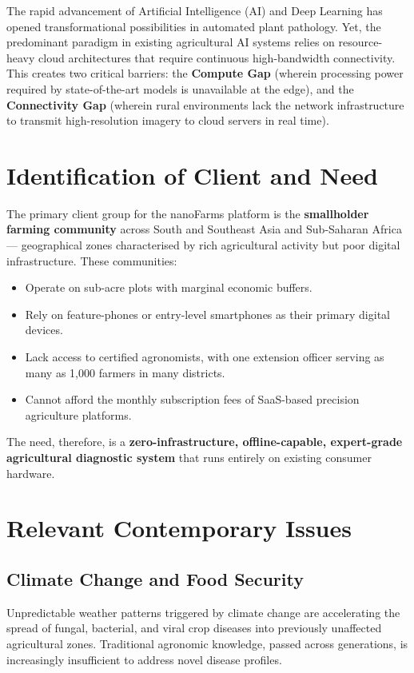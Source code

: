 \documentclass[12pt,oneside]{report}
\begin{document}
The rapid advancement of Artificial Intelligence (AI) and Deep Learning has opened transformational possibilities in automated plant pathology. Yet, the predominant paradigm in existing agricultural AI systems relies on resource-heavy cloud architectures that require continuous high-bandwidth connectivity. This creates two critical barriers: the \textbf{Compute Gap} (wherein processing power required by state-of-the-art models is unavailable at the edge), and the \textbf{Connectivity Gap} (wherein rural environments lack the network infrastructure to transmit high-resolution imagery to cloud servers in real time).

\section{Identification of Client and Need}
The primary client group for the nanoFarms platform is the \textbf{smallholder farming community} across South and Southeast Asia and Sub-Saharan Africa — geographical zones characterised by rich agricultural activity but poor digital infrastructure. These communities:

\begin{itemize}
    \item Operate on sub-acre plots with marginal economic buffers.
    \item Rely on feature-phones or entry-level smartphones as their primary digital devices.
    \item Lack access to certified agronomists, with one extension officer serving as many as 1,000 farmers in many districts.
    \item Cannot afford the monthly subscription fees of SaaS-based precision agriculture platforms.
\end{itemize}

The need, therefore, is a \textbf{zero-infrastructure, offline-capable, expert-grade agricultural diagnostic system} that runs entirely on existing consumer hardware.

\section{Relevant Contemporary Issues}

\subsection{Climate Change and Food Security}
Unpredictable weather patterns triggered by climate change are accelerating the spread of fungal, bacterial, and viral crop diseases into previously unaffected agricultural zones. Traditional agronomic knowledge, passed across generations, is increasingly insufficient to address novel disease profiles.
\end{document}
